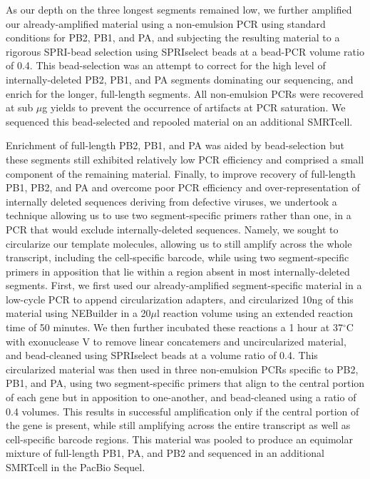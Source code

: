 \documentclass[9pt,lineno]{elife}
\begin{document}
As our depth on the three longest segments remained low, we further amplified our already-amplified material using a non-emulsion PCR using standard conditions for PB2, PB1, and PA, and subjecting the resulting material to a rigorous SPRI-bead selection using SPRIselect beads at a bead-PCR volume ratio of 0.4. 
This bead-selection was an attempt to correct for the high level of internally-deleted PB2, PB1, and PA segments dominating our sequencing, and enrich for the longer, full-length segments.
All non-emulsion PCRs were recovered at sub ${\mu}$g yields to prevent the occurrence of artifacts at PCR saturation.
We sequenced this bead-selected and repooled material on an additional SMRTcell.

Enrichment of full-length PB2, PB1, and PA was aided by bead-selection but these segments still exhibited relatively low PCR efficiency and comprised a small component of the remaining material.
Finally, to improve recovery of full-length PB1, PB2, and PA and overcome poor PCR efficiency and over-representation of internally deleted sequences deriving from defective viruses, we undertook a technique allowing us to use two segment-specific primers rather than one, in a PCR that would exclude internally-deleted sequences.
Namely, we sought to circularize our template molecules, allowing us to still amplify across the whole transcript, including the cell-specific barcode, while using two segment-specific primers in apposition that lie within a region absent in most internally-deleted segments.
First, we first used our already-amplified segment-specific material in a low-cycle PCR to append circularization adapters, and circularized 10ng of this material using NEBuilder in a 20${\mu}$l reaction volume using an extended reaction time of 50 minutes.
We then further incubated these reactions a  1 hour at 37$^{\circ}$C with exonuclease V to remove linear concatemers and uncircularized material, and bead-cleaned using SPRIselect beads at a volume ratio of 0.4.
This circularized material was then used in three non-emulsion PCRs specific to PB2, PB1, and PA, using two segment-specific primers that align to the central portion of each gene but in apposition to one-another, and bead-cleaned using a ratio of 0.4 volumes.
This results in successful amplification only if the central portion of the gene is present, while still amplifying across the entire transcript as well as cell-specific barcode regions. 
This material was pooled to produce an equimolar mixture of full-length PB1, PA, and PB2 and sequenced in an additional SMRTcell in the PacBio Sequel. 
\end{document}
